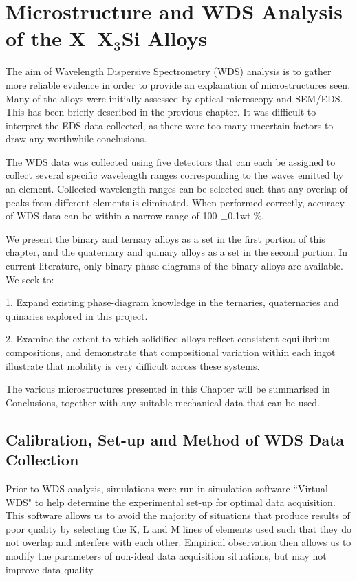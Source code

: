 
\chapter{Microstructure and WDS Analysis of the X--X$_3$Si Alloys}

The aim of Wavelength Dispersive Spectrometry (WDS) analysis is to gather more reliable evidence in order to provide an explanation of microstructures seen.  Many of the alloys were initially assessed by optical microscopy and SEM/EDS.  This has been briefly described in the previous chapter.  It was difficult to interpret the EDS data collected, as there were too many uncertain factors to draw any worthwhile conclusions.

The WDS data was collected using five detectors that can each be assigned to collect several specific wavelength ranges corresponding to the waves emitted by an element.  Collected wavelength ranges can be selected such that any overlap of peaks from different elements is eliminated.  When performed correctly, accuracy of WDS data can be within a narrow range of 100 $\pm$0.1wt.\%.  

We present the binary and ternary alloys as a set in the first portion of this chapter, and the quaternary and quinary alloys as a set in the second portion.
In current literature, only binary phase-diagrams of the binary alloys are available.  We seek to:

1.  Expand existing phase-diagram knowledge in the ternaries, quaternaries and quinaries explored in this project.

2.  Examine the extent to which solidified alloys reflect consistent equilibrium compositions, and demonstrate that  compositional variation within each ingot illustrate that mobility is very difficult across these systems.

The various microstructures presented in this Chapter will be summarised in Conclusions, together with any suitable mechanical data that can be used.

\section{Calibration, Set-up and Method of WDS Data Collection}

Prior to WDS analysis, simulations were run in simulation software ``Virtual WDS" to help determine the experimental set-up for optimal data acquisition.  This software allows us to avoid the majority of situations that produce results of poor quality by selecting the K, L and M lines of elements used such that they do not overlap and interfere with each other.  Empirical observation then allows us to modify the parameters of non-ideal data acquisition situations, but may not improve data quality.  

